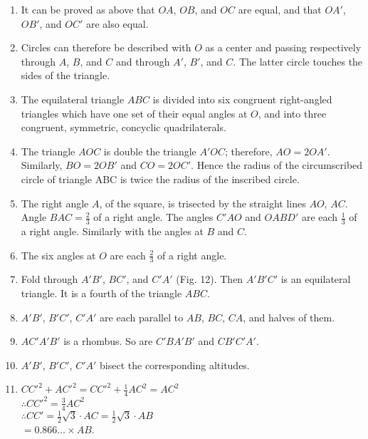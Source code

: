 \begin{enumerate}
    \item It can be proved as above that $OA$, $OB$, and $OC$ are equal, and
        that $OA'$, $OB'$, and $OC'$ are also equal.

    \item Circles can therefore be described with $O$ as a center and passing
        respectively through $A$, $B$, and $C$ and through $A'$, $B'$, and $C$.
        The latter circle touches the sides of the triangle.
    
    \item The equilateral triangle $ABC$ is divided into six congruent
        right-angled triangles which have one set of their equal angles at $O$,
        and into three congruent, symmetric, concyclic quadrilaterals.

    \item The triangle $AOC$ is double the triangle $A'OC$; therefore, $AO = 2
        OA'$.  Similarly, $BO=2OB'$ and $CO=2OC'$. Hence the radius of the
        circumscribed circle of triangle ABC is twice the radius of the
        inscribed circle.
    
    \item The right angle $A$, of the square, is trisected by the straight lines
        $AO$, $AC$.  Angle $BAC = \frac{2}{3}$ of a right angle. The angles
        $C'AO$ and $OABD'$ are each $\frac{1}{3}$ of a right angle.  Similarly
        with the angles at $B$ and $C$.

    \item The six angles at $O$ are each $\frac{2}{3}$ of a right angle.
    
    \item Fold through $A'B'$, $BC'$, and $C'A'$ (Fig. 12).  Then $A'B'C'$ is an
        equilateral triangle.  It is a fourth of the triangle $ABC$.
    
    \item $A'B'$, $B'C'$, $C'A'$ are each parallel to $AB$, $BC$, $CA$, and
        halves of them.
    
    \item $AC'A'B'$ is a rhombus. So are $C'BA'B'$ and $CB'C'A'$.
    
    \item $A'B'$, $B'C'$, $C'A'$ bisect the corresponding altitudes.
    
    \item $CC'^{2} + AC'^{2} =  CC'^{2} + \frac{1}{4} AC^{2} = AC^{2}$\\
        $\therefore CC'^{2} = \frac{3}{4} AC^{2}$\\
        $\therefore CC' = \frac{1}{2} \sqrt{3} \cdot AC = \frac{1}{2} \sqrt{3}
        \cdot AB $\\
        $ = 0.866\ldots \times AB$.
    

\end{enumerate}
